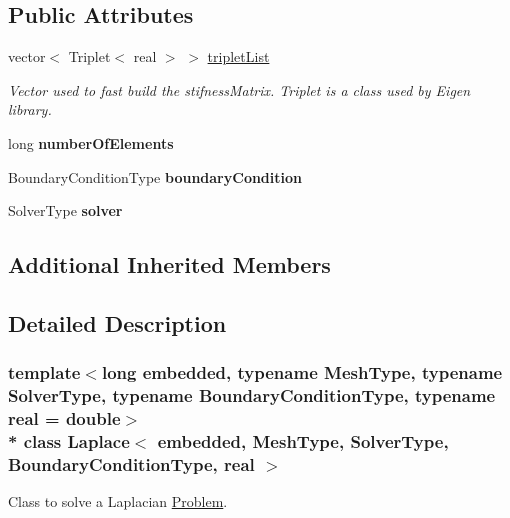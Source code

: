 \subsection*{Public Attributes}
\begin{DoxyCompactItemize}
\item 
vector$<$ Triplet$<$ real $>$ $>$ \hyperlink{class_laplace_a3c7f5f7a6eaca88b6cbfee3afdfe4c07}{triplet\+List}\hypertarget{class_laplace_a3c7f5f7a6eaca88b6cbfee3afdfe4c07}{}\label{class_laplace_a3c7f5f7a6eaca88b6cbfee3afdfe4c07}

\begin{DoxyCompactList}\small\item\em Vector used to fast build the stifness\+Matrix. Triplet is a class used by Eigen library. \end{DoxyCompactList}\item 
long {\bfseries number\+Of\+Elements}\hypertarget{class_laplace_a0654b60f9552d97136a11ea7836e219b}{}\label{class_laplace_a0654b60f9552d97136a11ea7836e219b}

\item 
Boundary\+Condition\+Type {\bfseries boundary\+Condition}\hypertarget{class_laplace_a5e83c7cde7aa4051caf619d41b9642c0}{}\label{class_laplace_a5e83c7cde7aa4051caf619d41b9642c0}

\item 
Solver\+Type {\bfseries solver}\hypertarget{class_laplace_a288665cbc9433c15e61dbf08b04654a3}{}\label{class_laplace_a288665cbc9433c15e61dbf08b04654a3}

\end{DoxyCompactItemize}
\subsection*{Additional Inherited Members}


\subsection{Detailed Description}
\subsubsection*{template$<$long embedded, typename Mesh\+Type, typename Solver\+Type, typename Boundary\+Condition\+Type, typename real = double$>$\\*
class Laplace$<$ embedded, Mesh\+Type, Solver\+Type, Boundary\+Condition\+Type, real $>$}

Class to solve a Laplacian \hyperlink{class_problem}{Problem}. 


